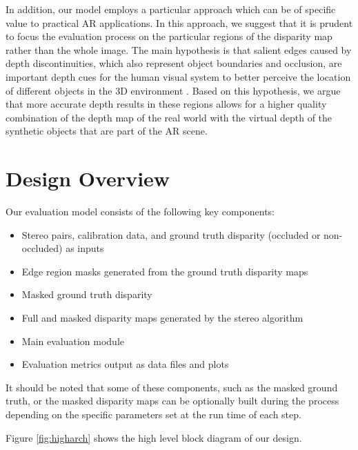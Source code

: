 In addition, our model employs a particular approach which can be of specific value to practical AR applications. In this approach, we suggest that
it is prudent to focus the evaluation process on the particular regions of the disparity map rather than the whole image. The main hypothesis
is that salient edges caused by depth discontinuities, which also represent object boundaries and occlusion, are important depth cues for the human
visual system to better perceive the location of different objects in the 3D environment \cite{sze11}.
Based on this hypothesis, we argue that more accurate depth results in these regions allows for a higher quality combination of the depth map of the real world with the 
virtual depth of the synthetic objects that are part of the AR scene.

\section{Design Overview}

Our evaluation model consists of the following key components:

\begin{itemize}
\item Stereo pairs, calibration data, and ground truth disparity (occluded or non-occluded) as inputs
\item Edge region masks generated from the ground truth disparity maps
\item Masked ground truth disparity
\item Full and masked disparity maps generated by the stereo algorithm 
\item Main evaluation module
\item Evaluation metrics output as data files and plots
\end{itemize}

It should be noted that some of these components, such as the masked ground truth, or the masked disparity maps 
can be optionally built during the process depending on the specific parameters set at the run time of each step.

Figure \ref{fig:higharch} shows the high level block diagram of our design.

